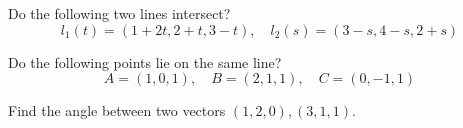 \documentclass[openany]{book}
\begin{document}
\begin{prob}
    Do the following two lines intersect?
    \begin{equation*}
        l_1(t)=(1+2t, 2+t, 3-t), \quad l_2(s)=(3-s, 4-s, 2+s)
    \end{equation*}
\end{prob}


\begin{prob}
    Do the following points lie on the same line?
    \begin{equation*}
        A=(1,0,1),\quad B=(2,1,1), \quad C=(0,-1,1)
    \end{equation*}
\end{prob}


\begin{prob}
    Find the angle between two vectors $(1,2,0), (3,1,1)$.
\end{prob}
\end{document}

